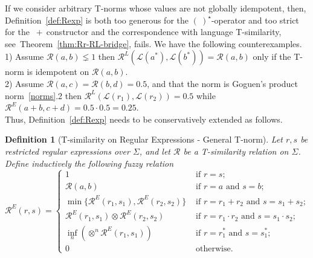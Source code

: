 \documentclass{article}
\newtheorem{definition}{Definition}[section]
\begin{document}

If we consider arbitrary T-norms whose values are not globally idempotent, then, Definition~\ref{def:Rexp} is both too generous for the $(\ )^\star$-operator and too strict for the $\ +\ $constructor and the correspondence with language T-similarity, see~Theorem~\ref{thm:Rr-RL-bridge}, fails. 
We have the following counterexamples.\\ 1) Assume $\mathcal R(a,b)\lneq 1$ then $\mathcal R^L(\mathcal L(a^*),\mathcal L(b^*))= \mathcal R(a,b)$ only if the T-norm is idempotent on $\mathcal R(a,b)$. \\ 2) Assume
\(\mathcal R(a,c)=\mathcal R(b,d)=0.5\), and that the norm is Goguen's product norm~\ref{norms}.2 then \(\mathcal R^L(\mathcal L(r_1),\mathcal L(r_2))=0.5\) while \(\mathcal R^E(a+b,c+d)=0.5\cdot0.5=0.25\).\\
Thus, Definition~\ref{def:Rexp} needs to be conservatively extended as follows.

\begin{definition}[T-similarity on Regular Expressions - General T-norm] \label{def:Rexpg}
Let $r,s$ be restricted regular expressions over $\Sigma$, and let $\mathcal{R}$ be a T-similarity relation on $\Sigma$. Define inductively the following fuzzy relation
$$\mathcal{R}^E(r,s) = \begin{cases}1 & \mbox{ if } r=s; \\
                                                       \mathcal{R}(a,b) & \mbox{ if } r=a \mbox{ and } s=b; \\
                                                      \min\!{\big\{\mathcal{R}^E(r_1,s_1), \mathcal{R}^E(r_2,s_2) \big\}}& \mbox{ if } r=r_1+r_2 \mbox{ and } s=s_1+s_2; \\
                                                      \mathcal{R}^E(r_1,s_1) \otimes \mathcal{R}^E(r_2,s_2) & \mbox{ if } r=r_1\cdot r_2 \mbox{ and } s=s_1\cdot s_2; \\
                                                       \inf_n( \otimes^n \mathcal{R}^E(r_1,s_1) ) & \mbox{ if } r=r_1^* \mbox{ and } s=s_1^*; \\
                                                        0 & \mbox{ otherwise.}
\end{cases}$$
\end{definition}
\end{document}
